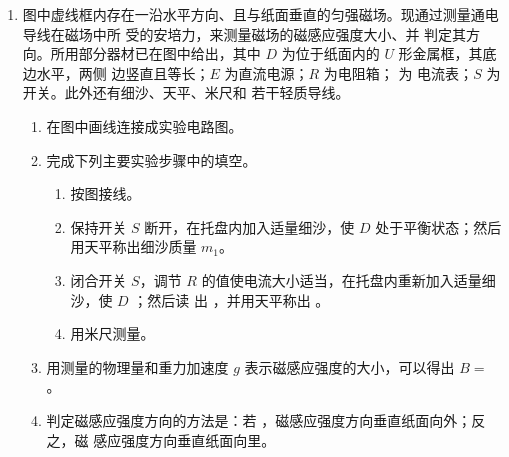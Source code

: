 \begin{enumerate}
\item 
{}
图中虚线框内存在一沿水平方向、且与纸面垂直的匀强磁场。现通过测量通电导线在磁场中所
受的安培力，来测量磁场的磁感应强度大小、并
判定其方向。所用部分器材已在图中给出，其中 $ D $
为位于纸面内的 $ U $ 形金属框，其底边水平，两侧
边竖直且等长；$ E $ 为直流电源；$ R $ 为电阻箱； \ammetermytikz 为
电流表；$ S $ 为开关。此外还有细沙、天平、米尺和
若干轻质导线。
\begin{figure}[h!]
\centering
 
\end{figure}

\begin{enumerate}
\item
在图中画线连接成实验电路图。
\item 
完成下列主要实验步骤中的填空。
\begin{enumerate}
\item
按图接线。

\item 
保持开关 $ S $ 断开，在托盘内加入适量细沙，使 $ D $ 处于平衡状态；然后用天平称出细沙质量 $ m_{1} $。

\item 
闭合开关 $ S $，调节 $ R $ 的值使电流大小适当，在托盘内重新加入适量细沙，使 $ D $ \underlinegap ；然后读
出 \underlinegap ，并用天平称出 \underlinegap 。



\item 
用米尺测量。


\end{enumerate}


\item 
用测量的物理量和重力加速度 $ g $ 表示磁感应强度的大小，可以得出 $ B= $ \underlinegap 。
\item 
判定磁感应强度方向的方法是：若 \underlinegap ，磁感应强度方向垂直纸面向外；反之，磁
感应强度方向垂直纸面向里。

\end{enumerate}


\end{enumerate}
